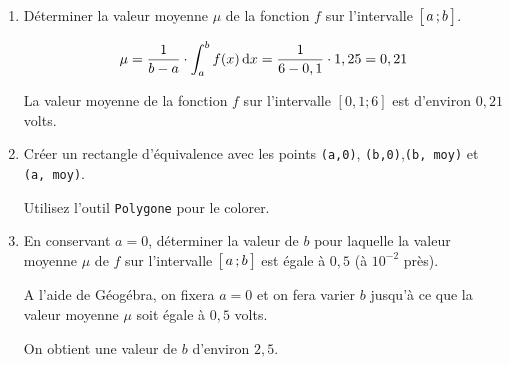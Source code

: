 \documentclass[11pt, a4paper]{report}
\begin{document}
\begin{enumerate}[resume]
    \item Déterminer la valeur moyenne $\mu$ de la fonction $f$ sur l'intervalle $\bigl[ \, a \, ; b \,\bigl]$.
    \begin{blocvisible}[height=3]
        \[\mu = \frac{1}{b-a}\cdot \int_a^b f(x) \,\mathrm{d}x = \frac{1}{6-0,1} \cdot 1,25 = 0,21\]

        La valeur moyenne de la fonction $f$ sur l'intervalle $[0,1 ; 6]$ est d'environ $0,21$ volts.
    \end{blocvisible}

    \item Créer un rectangle d'équivalence avec les points \verb|(a,0)|, \verb|(b,0)|,\verb|(b, moy)| et \verb|(a, moy)|. 
    
    Utilisez l'outil \verb|Polygone| pour le colorer. 

    \item En conservant $a=0$, déterminer la valeur de $b$ pour laquelle la valeur moyenne $\mu$ de $f$ sur l'intervalle $\bigl[ \, a \, ; b \,\bigl]$ est égale à $0,5$  (à $10^{-2}$ près). 
    \begin{blocvisible}[height=3]
        A l'aide de Géogébra, on fixera $a=0$ et on fera varier $b$ jusqu'à ce que la valeur moyenne $\mu$ soit égale à $0,5$ volts.

        On obtient une valeur de $b$ d'environ $2,5$.
    \end{blocvisible}
\end{enumerate}
\end{document}
